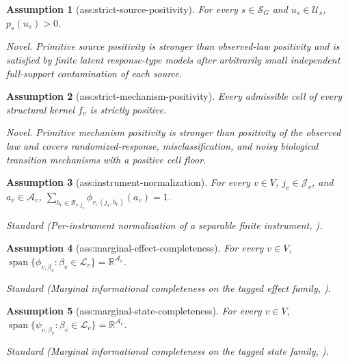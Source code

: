 \documentclass{article}
\newtheorem{assumption}{Assumption}
\begin{document}
\begin{assumption}[ass:strict-source-positivity]\label{ass:strict-source-positivity}
For every \(s\in\mathcal S_G\) and \(u_s\in\mathcal U_s\), \(p_s(u_s)>0\).
\par\smallskip\noindent\emph{Novel.} Primitive source positivity is stronger than observed-law positivity and is satisfied by finite latent response-type models after arbitrarily small independent full-support contamination of each source.
\end{assumption}

\begin{assumption}[ass:strict-mechanism-positivity]\label{ass:strict-mechanism-positivity}
Every admissible cell of every structural kernel \(f_v\) is strictly positive.
\par\smallskip\noindent\emph{Novel.} Primitive mechanism positivity is stronger than positivity of the observed law and covers randomized-response, misclassification, and noisy biological transition mechanisms with a positive cell floor.
\end{assumption}

\begin{assumption}[ass:instrument-normalization]\label{ass:instrument-normalization}
For every \(v\in V\), \(j_v\in\mathcal J_v\), and \(a_v\in\mathcal A_v\), \(\sum_{b_v\in\mathcal B_{v,j_v}}\phi_{v,(j_v,b_v)}(a_v)=1\).
\par\smallskip\noindent\emph{Standard} (Per-instrument normalization of a separable finite instrument, \cite{FriendKissingerSpekkensWolfe2025}).
\end{assumption}

\begin{assumption}[ass:marginal-effect-completeness]\label{ass:marginal-effect-completeness}
For every \(v\in V\), \(\operatorname{span}\{\phi_{v,\beta_v}:\beta_v\in\mathcal L_v\}=\mathbb R^{\mathcal A_v}\).
\par\smallskip\noindent\emph{Standard} (Marginal informational completeness on the tagged effect family, \cite{FriendKissingerSpekkensWolfe2025}).
\end{assumption}

\begin{assumption}[ass:marginal-state-completeness]\label{ass:marginal-state-completeness}
For every \(v\in V\), \(\operatorname{span}\{\psi_{v,\beta_v}:\beta_v\in\mathcal L_v\}=\mathbb R^{\mathcal A_v}\).
\par\smallskip\noindent\emph{Standard} (Marginal informational completeness on the tagged state family, \cite{FriendKissingerSpekkensWolfe2025}).
\end{assumption}
\end{document}
